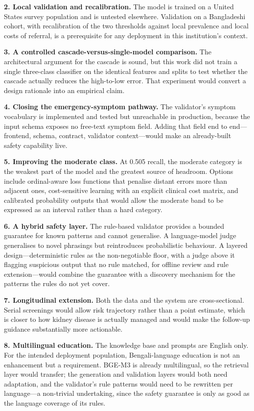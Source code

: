 \textbf{2. Local validation and recalibration.} The model is trained on a United
States survey population and is untested elsewhere. Validation on a Bangladeshi
cohort, with recalibration of the two thresholds against local prevalence and
local costs of referral, is a prerequisite for any deployment in this
institution's context.

\textbf{3. A controlled cascade-versus-single-model comparison.} The
architectural argument for the cascade is sound, but this work did not train a
single three-class classifier on the identical features and splits to test
whether the cascade actually reduces the high-to-low error. That experiment
would convert a design rationale into an empirical claim.

\textbf{4. Closing the emergency-symptom pathway.} The validator's symptom
vocabulary is implemented and tested but unreachable in production, because the
input schema exposes no free-text symptom field. Adding that field end to
end---frontend, schema, contract, validator context---would make an already-built
safety capability live.

\textbf{5. Improving the moderate class.} At 0.505 recall, the moderate category
is the weakest part of the model and the greatest source of headroom. Options
include ordinal-aware loss functions that penalise distant errors more than
adjacent ones, cost-sensitive learning with an explicit clinical cost matrix,
and calibrated probability outputs that would allow the moderate band to be
expressed as an interval rather than a hard category.

\textbf{6. A hybrid safety layer.} The rule-based validator provides a bounded
guarantee for known patterns and cannot generalise. A language-model judge
generalises to novel phrasings but reintroduces probabilistic behaviour. A
layered design---deterministic rules as the non-negotiable floor, with a judge
above it flagging suspicious output that no rule matched, for offline review and
rule extension---would combine the guarantee with a discovery mechanism for the
patterns the rules do not yet cover.

\textbf{7. Longitudinal extension.} Both the data and the system are
cross-sectional. Serial screenings would allow risk trajectory rather than a
point estimate, which is closer to how kidney disease is actually managed and
would make the follow-up guidance substantially more actionable.

\textbf{8. Multilingual education.} The knowledge base and prompts are English
only. For the intended deployment population, Bengali-language education is not
an enhancement but a requirement. BGE-M3 is already multilingual, so the
retrieval layer would transfer; the generation and validation layers would both
need adaptation, and the validator's rule patterns would need to be rewritten
per language---a non-trivial undertaking, since the safety guarantee is only as
good as the language coverage of its rules.

